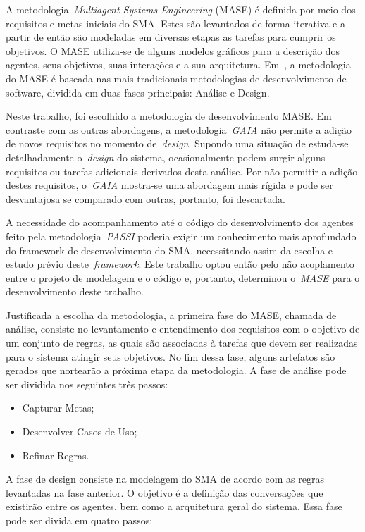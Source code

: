 A metodologia~\emph{Multiagent Systems Engineering} (MASE) é definida por meio dos requisitos e metas iniciais do SMA. Estes são levantados de forma iterativa e a partir de então são modeladas em diversas etapas as tarefas para cumprir os objetivos. O MASE utiliza-se de alguns modelos gráficos para a descrição dos agentes, seus objetivos, suas interações e a sua arquitetura. Em~\cite{scott01}, a metodologia do MASE é baseada nas mais tradicionais metodologias de desenvolvimento de software, dividida em duas fases principais: Análise e Design.

Neste trabalho, foi escolhido a metodologia de desenvolvimento MASE. Em contraste com as outras abordagens, a metodologia~\emph{GAIA} não permite a adição de novos requisitos no momento de~\emph{design}. Supondo uma situação de estuda-se detalhadamente o~\emph{design} do sistema, ocasionalmente podem surgir alguns requisitos ou tarefas adicionais derivados desta análise. Por não permitir a adição destes requisitos, o~\emph{GAIA} mostra-se uma abordagem mais rígida e pode ser desvantajosa se comparado com outras, portanto, foi descartada.

A necessidade do acompanhamento até o código do desenvolvimento dos agentes feito pela metodologia~\emph{PASSI} poderia exigir um conhecimento mais aprofundado do framework de desenvolvimento do SMA, necessitando assim da escolha e estudo prévio deste~\emph{framework}. Este trabalho optou então pelo não acoplamento entre o projeto de modelagem e o código e, portanto, determinou o~\emph{MASE} para o desenvolvimento deste trabalho.

Justificada a escolha da metodologia, a primeira fase do MASE, chamada de análise, consiste no levantamento e entendimento dos requisitos com o objetivo de um conjunto de regras, as quais são associadas à tarefas que devem ser realizadas para o sistema atingir seus objetivos. No fim dessa fase, alguns artefatos são gerados que nortearão a próxima etapa da metodologia. A fase de análise pode ser dividida nos seguintes três passos:

\begin{itemize}
	\item Capturar Metas;
	\item Desenvolver Casos de Uso;
	\item Refinar Regras.
\end{itemize}

A fase de design consiste na modelagem do SMA de acordo com as regras levantadas na fase anterior. O objetivo é a definição das conversações que existirão entre os agentes, bem como a arquitetura geral do sistema. Essa fase pode ser divida em quatro passos:

